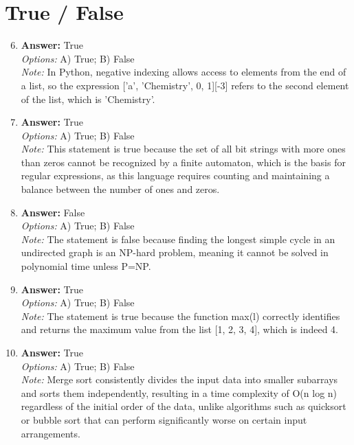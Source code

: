 \documentclass[12pt]{article}
\begin{document}
\section*{True / False}
\begin{enumerate}[label=\arabic*.]
\setcounter{enumi}{5}
\item \textbf{Answer:} True
\\ \textit{Options:} A) True; B) False
\\ \textit{Note:} In Python, negative indexing allows access to elements from the end of a list, so the expression ['a', 'Chemistry', 0, 1][-3] refers to the second element of the list, which is 'Chemistry'.
\item \textbf{Answer:} True
\\ \textit{Options:} A) True; B) False
\\ \textit{Note:} This statement is true because the set of all bit strings with more ones than zeros cannot be recognized by a finite automaton, which is the basis for regular expressions, as this language requires counting and maintaining a balance between the number of ones and zeros.
\item \textbf{Answer:} False
\\ \textit{Options:} A) True; B) False
\\ \textit{Note:} The statement is false because finding the longest simple cycle in an undirected graph is an NP-hard problem, meaning it cannot be solved in polynomial time unless P=NP.
\item \textbf{Answer:} True
\\ \textit{Options:} A) True; B) False
\\ \textit{Note:} The statement is true because the function max(l) correctly identifies and returns the maximum value from the list [1, 2, 3, 4], which is indeed 4.
\item \textbf{Answer:} True
\\ \textit{Options:} A) True; B) False
\\ \textit{Note:} Merge sort consistently divides the input data into smaller subarrays and sorts them independently, resulting in a time complexity of O(n log n) regardless of the initial order of the data, unlike algorithms such as quicksort or bubble sort that can perform significantly worse on certain input arrangements.
\end{enumerate}
\end{document}
